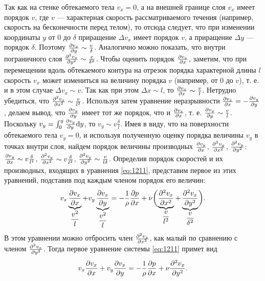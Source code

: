 	Так как на стенке обтекаемого тела $v_x = 0$, а на внешней границе слоя $v_x$ имеет порядок $v$, где $v$ --- характерная скорость рассматриваемого течения (например, скорость на бесконечности перед телом), то отсюда следует, что при изменении координаты $y$ от 0 до $\delta$ приращение $\Delta v_x$ имеет порядок $v$, а приращение $\Delta y$ --- порядок $\delta$. Поэтому $\frac{\partial v_x}{\partial y} \sim \frac{v}{\delta}$. Аналогично можно показать, что внутри пограничного слоя $\frac{\partial^2 v_x}{\partial y^2} \sim \frac{v}{\delta^2}$. Чтобы оценить порядок $\frac{\partial v_x}{\partial x}$, заметим, что при перемещении вдоль обтекаемого контура на отрезок порядка характерной длины $l$ скорость $v_x$ может измениться на величину порядка $v$ (например, от $0$ до $v$), т. е. и в этом случае $\Delta v_x \sim v$. Так как при этом $\Delta x \sim l$, то $\frac{\partial v_x}{\partial x} \sim \frac{v}{l}$.\n
	Нетрудно убедиться, что $\frac{\partial^2 v_x}{\partial x^2} \sim \frac{v}{l^2}$. Используя затем уравнение неразрывности $\frac{\partial v_x}{\partial x} = -\frac{\partial v_y}{\partial y}$, делаем вывод, что $\frac{\partial v_y}{\partial y}$ имеет тот же порядок, что и $\frac{\partial v_x}{\partial x}$, т. е. $\frac{\partial v_y}{\partial y} \sim \frac{v}{l}$.\n
	Поскольку $v_y = \int_{0}^{y}\frac{\pp v_y}{\pp y}\dd y$, то $v_y \sim v\frac{\delta}{l}$.\n
	Имея в виду, что на поверхности обтекаемого тела $v_y = 0$, и используя полученную оценку порядка величины $v_y$ в точках внутри слоя, найдем порядок величины производных $\frac{\partial v_y}{\partial x}$, $\frac{\partial^2 v_y}{\partial x^2}$, $\frac{\partial^2 v_y}{\partial y^2}$: $\frac{\partial v_y}{\partial x} \sim v\frac{\delta}{l^2}$, $\frac{\partial^2 v_y}{\partial x^2} \sim v\frac{\delta}{l^2}$, $\frac{\partial^2 v_y}{\partial y^2} \sim \frac{v}{l\delta}$.\n
	Определив порядок скоростей и их производных, входящих в уравнения \eqref{eq:1211}, представим первое из этих уравнений, подставив под каждым членом порядок его величин:
	\begin{gather*}
		v_x\underbrace{\frac{\partial v_x}{\partial x}}_{\dfrac{v^2}{l}} + v_y\underbrace{\frac{\partial v_x}{\partial y}}_{\dfrac{v^2}{l}} = -\frac{1}{\rho}\frac{\partial p}{\partial x} + \nu\biggl(\underbrace{\frac{\partial^2 v_x}{\partial x^2}}_{\dfrac{v}{l^2}} + \underbrace{\frac{\partial^2 v_x}{\partial y^2}}_{\dfrac{v}{\delta^2}}\biggr).
	\end{gather*}\n
	В этом уравнении можно отбросить член $\frac{\partial^2 v_x}{\partial x^2}$, как малый по сравнению с членом $\frac{\partial^2 v_x}{\partial y^2}$. Тогда первое уравнение системы \eqref{eq:1211} примет вид
	\begin{gather*}
		v_x\frac{\partial v_x}{\partial x} + v_y\frac{\partial v_x}{\partial y} = -\frac{1}{\rho}\frac{\partial p}{\partial x} + \nu\frac{\partial^2 v_x}{\partial y^2}.
	\end{gather*}\n
